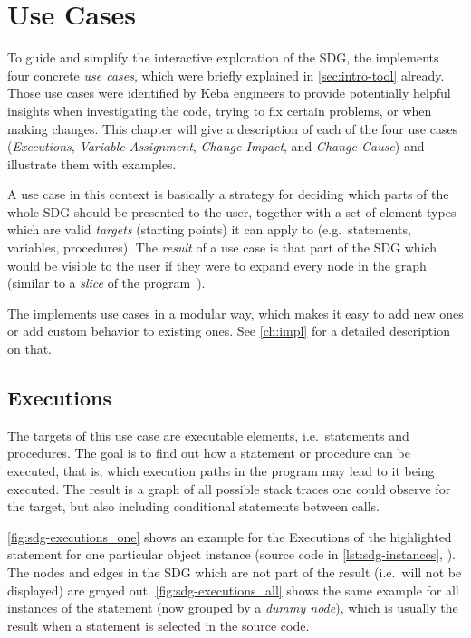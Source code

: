 \chapter{Use Cases} \label{ch:usecases}

To guide and simplify the interactive exploration of the SDG, the \SB implements four concrete \emph{use cases}, which 
were briefly explained in \autoref{sec:intro-tool} already. Those use cases were identified by Keba engineers to 
provide potentially helpful insights when investigating the code, trying to fix certain problems, or when making 
changes. This chapter will give a description of each of the four use cases (\emph{Executions}, \emph{Variable 
Assignment}, \emph{Change Impact}, and \emph{Change Cause}) and illustrate them with examples.

A use case in this context is basically a strategy for deciding which parts of the whole SDG should be presented to the 
user, together with a set of element types which are valid \emph{targets} (starting points) it can apply to (e.g.\ 
statements, variables, procedures). The \emph{result} of a use case is that part of the SDG which would be visible to 
the user if they were to expand every node in the graph (similar to a \emph{slice} of the 
program~\cite{DBLP:journals/tse/Weiser84}).

The \SB implements use cases in a modular way, which makes it easy to add new ones or add custom behavior to existing 
ones. See \autoref{ch:impl} for a detailed description on that.


\section{Executions}

The targets of this use case are executable elements, i.e.\ statements and procedures. The goal is to find out how 
a statement or procedure can be executed, that is, which execution paths in the program may lead to it being executed. 
The result is a graph of all possible stack traces one could observe for the target, but also including conditional 
statements between calls.

\autoref{fig:sdg-executions_one} shows an example for the Executions of the highlighted statement for one particular 
object instance (source code in \autoref{lst:sdg-instances}, \autopageref{lst:sdg-instances}). The nodes and edges in 
the SDG which are not part of the result (i.e.\ will not be displayed) are grayed out. \autoref{fig:sdg-executions_all} 
shows the same example for all instances of the statement (now grouped by a \emph{dummy node}), which is usually the 
result when a statement is selected in the source code.

